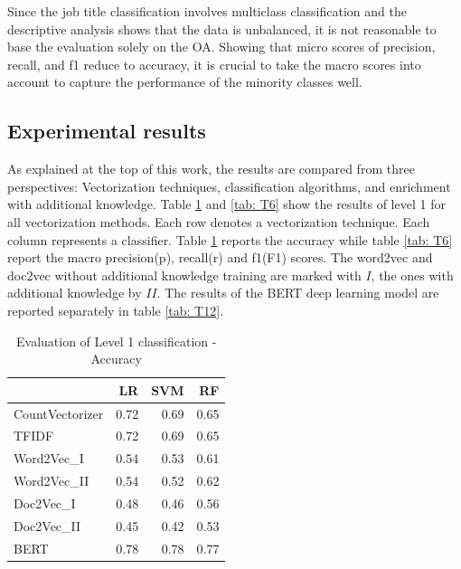 \documentclass[12pt, a4paper, titlepage]{article}
\begin{document}
Since the job title classification involves multiclass classification and the descriptive analysis shows that the data is unbalanced, it is not reasonable to base the evaluation solely on the \ac{OA}. Showing that micro scores of precision, recall, and f1 reduce to accuracy, it is crucial to take the macro scores into account to capture the performance of the minority classes well.

\subsection{Experimental results}
As explained at the top of this work, the results are compared from three perspectives: Vectorization techniques, classification algorithms, and enrichment with additional knowledge. Table \ref{tab: T5} and \ref{tab: T6} show the results of level 1 for all vectorization methods. Each row denotes a vectorization technique. Each column represents a classifier. Table \ref{tab: T5} reports the accuracy while table \ref{tab: T6}  report the macro precision(p), recall(r) and f1(F1) scores. The word2vec and doc2vec without additional knowledge training are marked with $I$, the ones with additional knowledge by $II$. The results of the \ac{BERT} deep learning model are reported separately in table \ref{tab: T12}. 


\begin{table}[hb!]
  \center
\begin{tabular}{lrrr} 
  \hline
  {} &    \textbf{LR} &   \textbf{SVM} &    \textbf{RF} \\
  \hline
CountVectorizer &  0.72 &  0.69 &  0.65 \\
TFIDF           &  0.72 &  0.69 &  0.65 \\
Word2Vec\_I      &  0.54 &  0.53 &  0.61 \\
Word2Vec\_II     &  0.54 &  0.52 &  0.62 \\
Doc2Vec\_I       &  0.48 &  0.46 &  0.56 \\
Doc2Vec\_II      &  0.45 &  0.42 &  0.53 \\
BERT            &  0.78 &  0.78 &  0.77 \\
  \hline
  \end{tabular}
  \caption{\label{tab: T5} Evaluation of Level 1 classification - Accuracy}
\end{table}
\end{document}
